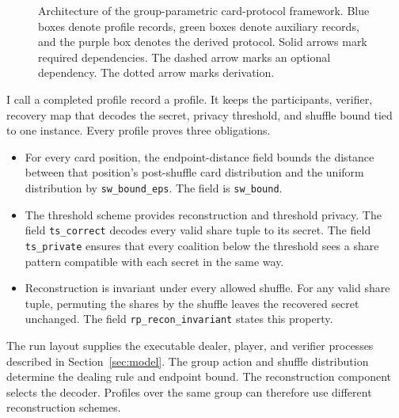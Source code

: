 \documentclass[runningheads]{llncs}
\newcommand{\coqin}[1]{\texttt{#1}}
\begin{document}
\begin{figure}[H]
{}
  \caption{Architecture of the group-parametric card-protocol framework. Blue boxes
denote profile records, green boxes denote auxiliary records, and the purple
box denotes the derived protocol. Solid arrows mark required dependencies. The
dashed arrow marks an optional dependency. The dotted arrow marks derivation.}
  \label{fig:framework-architecture}
\end{figure}

I call a completed profile record a profile. It keeps the participants,
verifier, recovery map that decodes the secret, privacy threshold, and shuffle
bound tied to one instance. Every profile proves three obligations.
\begin{itemize}
\item For every card position, the endpoint-distance field bounds the distance
between that position's post-shuffle card distribution and the uniform
distribution by \coqin{sw\_bound\_eps}. The field is \coqin{sw\_bound}.
\item The threshold scheme provides reconstruction and threshold privacy. The field
\coqin{ts\_correct} decodes every valid share tuple to its secret. The field
\coqin{ts\_private} ensures that every coalition below the threshold sees a
share pattern compatible with each secret in the same way.
\item Reconstruction is invariant under every allowed shuffle. For any valid share
tuple, permuting the shares by the shuffle leaves the recovered secret
unchanged. The field \coqin{rp\_recon\_invariant} states this property.
\end{itemize}

The run layout supplies the executable dealer, player, and verifier processes
described in Section~\ref{sec:model}. The group action and shuffle
distribution determine the dealing rule and endpoint bound. The reconstruction
component selects the decoder. Profiles over the same group can therefore use
different reconstruction schemes.
\end{document}
